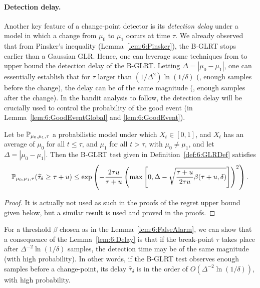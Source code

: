 \paragraph{Detection delay.}

Another key feature of a change-point detector is its \emph{detection delay} under a model in which a change from $\mu_0$ to $\mu_1$ occurs at time $\tau$. We already observed that from Pinsker's inequality (Lemma~\ref{lem:6:Pinsker}), the B-GLRT stops earlier than a Gaussian GLR. Hence, one can leverage some techniques from \cite{Maillard2018GLR} to upper bound the detection delay of the B-GLRT. Letting $\Delta = |\mu_0 - \mu_1|$, one can essentially establish that for $\tau$ larger than $(1/\Delta^2)\ln(1/\delta)$ (\ie, enough samples before the change), the delay can be of the same magnitude (\ie, enough samples after the change).
In the bandit analysis to follow, the detection delay will be crucially used to control the probability of the good event (in Lemma~\ref{lem:6:GoodEventGlobal} and \ref{lem:6:GoodEvent}).

\begin{lemma}\label{lem:6:Delay}
    Let be $\mathbb{P}_{\mu_0,\mu_1,\tau}$ a probabilistic model under which $X_t \in [0,1]$, and $X_t$ has an average of $\mu_0$ for all $t \leq \tau$, and $\mu_1$ for all $t > \tau$, with $\mu_0 \neq \mu_1$,
    and let $\Delta = |\mu_0 - \mu_1|$.
    Then the B-GLRT test given in Definition~\ref{def:6:GLRDef} satisfies
    \begin{equation}
        \mathbb{P}_{\mu_0,\mu_1,\tau} (\widehat{\tau}_{\delta} \geq \tau + u) \leq \exp\left( -\frac{2\tau u}{\tau + u}\left(\max\left[ 0, \Delta - \sqrt{\frac{\tau + u}{2\tau u} \beta(\tau + u,\delta)} \right]\right)^2 \right).
    \end{equation}
\end{lemma}
%
\begin{proof}
    It is actually not used as such in the proofs of the regret upper bound given below, but a similar result is used and proved in the proofs.
\end{proof}

For a threshold $\beta$ chosen as in the Lemma~\ref{lem:6:FalseAlarm}, we can show that a consequence of the Lemma~\ref{lem:6:Delay} is that if the break-point $\tau$ takes place after $\Delta^{-2} \ln(1/\delta)$ samples, the detection time may be of the same magnitude (with high probability).
%
In other words, if the B-GLRT test observes enough samples before a change-point,
its delay $\widehat{\tau}_\delta$ is in the order of $O(\Delta^{-2} \ln(1/\delta))$, with high probability.


